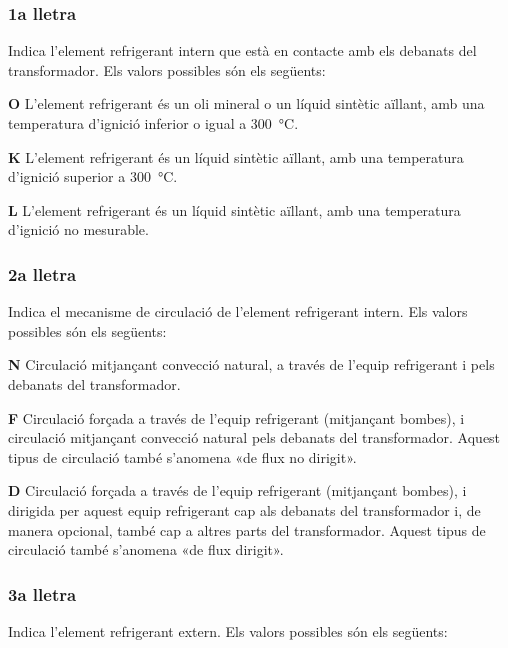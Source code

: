 \subsubsection*{1a lletra}
Indica l'element refrigerant intern que està en
contacte amb els debanats del transformador. Els valors possibles
són els següents:

\begin{list}{}
   {\setlength{\labelwidth}{10mm} \setlength{\leftmargin}{10mm} \setlength{\labelsep}{2mm}}
   \item[\textbf{O}] L'element refrigerant és un oli mineral o un líquid sintètic aïllant, amb una temperatura d'ignició
   inferior o igual a \SI{300}{\degreeCelsius}.
   \item[\textbf{K}] L'element refrigerant és un líquid sintètic aïllant, amb una temperatura d'ignició
   superior a \SI{300}{\degreeCelsius}.
   \item[\textbf{L}] L'element refrigerant és un líquid sintètic aïllant, amb una temperatura d'ignició
   no mesurable.
\end{list}
  

\subsubsection*{2a lletra}
Indica el mecanisme de circulació de l'element
refrigerant intern. Els valors possibles són els següents:

\begin{list}{}
   {\setlength{\labelwidth}{10mm} \setlength{\leftmargin}{10mm} \setlength{\labelsep}{2mm}}
   \item[\textbf{N}] Circulació mitjançant convecció natural,
    a través de l'equip refrigerant i pels debanats del transformador.
   \item[\textbf{F}] Circulació forçada a través de l'equip refrigerant (mitjançant bombes),
    i circulació mitjançant convecció natural pels debanats del
    transformador. Aquest tipus de circulació també s'anomena «de flux no
    dirigit».
   \item[\textbf{D}] Circulació forçada a través de l'equip refrigerant (mitjançant bombes),
    i dirigida per aquest equip refrigerant cap als debanats del
    transformador i, de manera opcional, també cap a altres parts del transformador. Aquest
    tipus de circulació també s'anomena «de flux dirigit».
\end{list}
  

\subsubsection*{3a lletra}
 Indica l'element refrigerant extern. Els valors
possibles són els següents:

